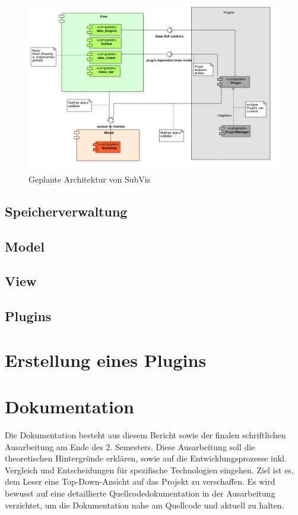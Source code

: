 \begin{figure}
  \centering
  \includegraphics[width=\textwidth]{content/media/subvis_architektur.png}
  \caption{Geplante Architektur von SubVis}
  \label{fig:subvis_architektur}
\end{figure}

\subsection{Speicherverwaltung}


\subsection{Model}

\subsection{View}

\subsection{Plugins}


\section{Erstellung eines Plugins}

\section{Dokumentation}

Die Dokumentation besteht aus diesem Bericht sowie der finalen schriftlichen Ausarbeitung am Ende des 2. Semesters.
Diese Ausarbeitung soll die theoretischen Hintergründe erklären, sowie auf die Entwicklungsprozesse inkl. Vergleich und Entscheidungen für spezifische Technologien eingehen.
Ziel ist es, dem Leser eine Top-Down-Ansicht auf das Projekt zu verschaffen.
Es wird bewusst auf eine detaillierte Quellcodedokumentation in der Ausarbeitung verzichtet, um die Dokumentation nahe am Quellcode und aktuell zu halten.

